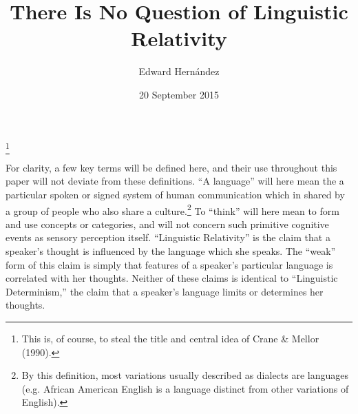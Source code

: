 \documentclass[man,12pt,natbib]{apa6}
\newcommand\blfootnote[1]{%
  \begingroup
  \renewcommand\thefootnote{}\footnote{#1}%
  \addtocounter{footnote}{-1}%
  \endgroup
}
\begin{document}
\title{There Is No Question of Linguistic Relativity}
\author{Edward Hern\'{a}ndez}
\date{20 September 2015}
\maketitle

\blfootnote{This is, of course, to steal the title and central idea of Crane \& Mellor (1990).}
\nocite{Crane90}

For clarity, a few key terms will be defined here, and their use throughout
this paper will not deviate from these definitions. ``A language'' will here
mean the a particular spoken or signed system of human communication which in
shared by a group of people who also share a culture.\footnote{By this
definition, most variations usually described as dialects are languages (e.g.
African American English is a language distinct from other variations of
English).} To ``think'' will here mean to form and use concepts or categories,
and will not concern such primitive cognitive events as sensory perception
itself. ``Linguistic Relativity'' is the claim that a speaker's thought is
influenced by the language which she speaks. The ``weak'' form of this claim is
simply that features of a speaker's particular language is correlated
with her thoughts. Neither of these claims is identical to ``Linguistic
Determinism,'' the claim that a speaker's language limits or determines her
thoughts.
\end{document}
